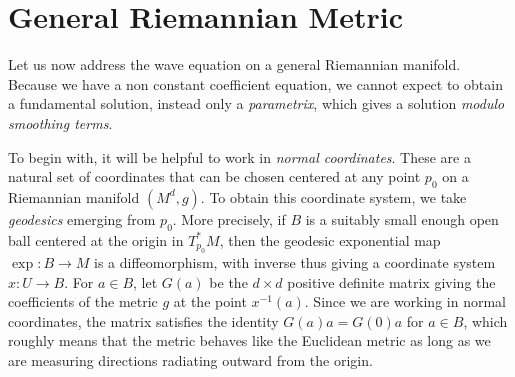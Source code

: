 %
%
%
%
%
%
%

\section{General Riemannian Metric}

Let us now address the wave equation on a general Riemannian manifold. Because we have a non constant coefficient equation, we cannot expect to obtain a fundamental solution, instead only a \emph{parametrix}, which gives a solution \emph{modulo smoothing terms}.

To begin with, it will be helpful to work in \emph{normal coordinates}. These are a natural set of coordinates that can be chosen centered at any point $p_0$ on a Riemannian manifold $(M^d,g)$. To obtain this coordinate system, we take \emph{geodesics} emerging from $p_0$. More precisely, if $B$ is a suitably small enough open ball centered at the origin in $T_{p_0}^* M$, then the geodesic exponential map $\exp: B \to M$ is a diffeomorphism, with inverse thus giving a coordinate system $x: U \to B$. For $a \in B$, let $G(a)$ be the $d \times d$ positive definite matrix giving the coefficients of the metric $g$ at the point $x^{-1}(a)$. Since we are working in normal coordinates, the matrix satisfies the identity $G(a) a = G(0) a$ for $a \in B$, which roughly means that the metric behaves like the Euclidean metric as long as we are measuring directions radiating outward from the origin.

